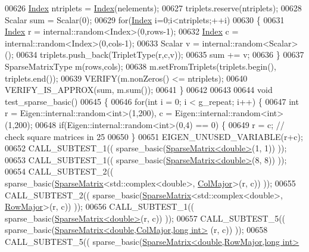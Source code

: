 \begin{DoxyCode}
00626   \hyperlink{namespace_eigen_a62e77e0933482dafde8fe197d9a2cfde}{Index} ntriplets = \hyperlink{namespace_eigen_a62e77e0933482dafde8fe197d9a2cfde}{Index}(nelements);
00627   triplets.reserve(ntriplets);
00628   Scalar sum = Scalar(0);
00629   \textcolor{keywordflow}{for}(\hyperlink{namespace_eigen_a62e77e0933482dafde8fe197d9a2cfde}{Index} i=0;i<ntriplets;++i)
00630   \{
00631     \hyperlink{namespace_eigen_a62e77e0933482dafde8fe197d9a2cfde}{Index} r = internal::random<Index>(0,rows-1);
00632     \hyperlink{namespace_eigen_a62e77e0933482dafde8fe197d9a2cfde}{Index} c = internal::random<Index>(0,cols-1);
00633     Scalar v = internal::random<Scalar>();
00634     triplets.push\_back(TripletType(r,c,v));
00635     sum += v;
00636   \}
00637   SparseMatrixType m(rows,cols);
00638   m.setFromTriplets(triplets.begin(), triplets.end());
00639   VERIFY(m.nonZeros() <= ntriplets);
00640   VERIFY\_IS\_APPROX(sum, m.sum());
00641 \}
00642 
00643 
00644 \textcolor{keywordtype}{void} test\_sparse\_basic()
00645 \{
00646   \textcolor{keywordflow}{for}(\textcolor{keywordtype}{int} i = 0; i < g\_repeat; i++) \{
00647     \textcolor{keywordtype}{int} r = Eigen::internal::random<int>(1,200), c = Eigen::internal::random<int>(1,200);
00648     \textcolor{keywordflow}{if}(Eigen::internal::random<int>(0,4) == 0) \{
00649       r = c; \textcolor{comment}{// check square matrices in 25%
00650     \}
00651     EIGEN\_UNUSED\_VARIABLE(r+c);
00652     CALL\_SUBTEST\_1(( sparse\_basic(\hyperlink{group___sparse_core___module}{SparseMatrix<double>}(1, 1)) ));
00653     CALL\_SUBTEST\_1(( sparse\_basic(\hyperlink{group___sparse_core___module}{SparseMatrix<double>}(8, 8)) ));
00654     CALL\_SUBTEST\_2(( sparse\_basic(\hyperlink{group___sparse_core___module_class_eigen_1_1_sparse_matrix}{SparseMatrix}<std::complex<double>, 
      \hyperlink{group__enums_ggaacded1a18ae58b0f554751f6cdf9eb13a0cbd4bdd0abcfc0224c5fcb5e4f6669a}{ColMajor}>(r, c)) ));
00655     CALL\_SUBTEST\_2(( sparse\_basic(\hyperlink{group___sparse_core___module_class_eigen_1_1_sparse_matrix}{SparseMatrix}<std::complex<double>, 
      \hyperlink{group__enums_ggaacded1a18ae58b0f554751f6cdf9eb13acfcde9cd8677c5f7caf6bd603666aae3}{RowMajor}>(r, c)) ));
00656     CALL\_SUBTEST\_1(( sparse\_basic(\hyperlink{group___sparse_core___module}{SparseMatrix<double>}(r, c)) ));
00657     CALL\_SUBTEST\_5(( sparse\_basic(\hyperlink{group___sparse_core___module_class_eigen_1_1_sparse_matrix}{SparseMatrix<double,ColMajor,long int>}
      (r, c)) ));
00658     CALL\_SUBTEST\_5(( sparse\_basic(\hyperlink{group___sparse_core___module_class_eigen_1_1_sparse_matrix}{SparseMatrix<double,RowMajor,long int>}
}
\end{DoxyCode}
